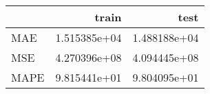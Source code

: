 \begin{tabular}{lrr}
\toprule
{} &         train &          test \\
\midrule
MAE  &  1.515385e+04 &  1.488188e+04 \\
MSE  &  4.270396e+08 &  4.094445e+08 \\
MAPE &  9.815441e+01 &  9.804095e+01 \\
\bottomrule
\end{tabular}
